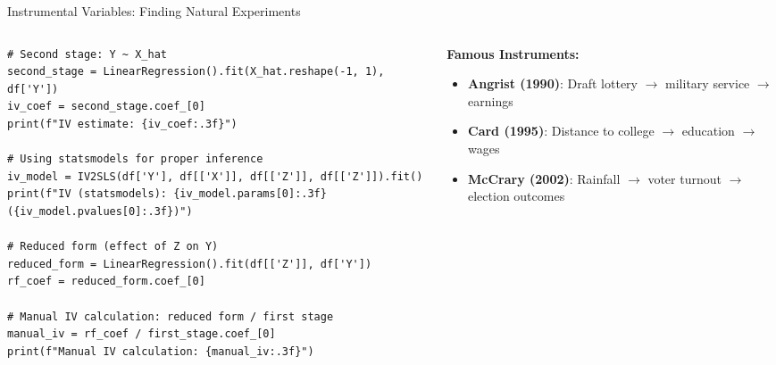 \documentclass[aspectratio=169,11pt]{beamer}
\begin{document}
\begin{frame}[fragile]{Instrumental Variables: Finding Natural Experiments}
\begin{columns}
\begin{column}{0.55\textwidth}
\begin{lstlisting}[basicstyle=\ttfamily\tiny]
# Second stage: Y ~ X_hat
second_stage = LinearRegression().fit(X_hat.reshape(-1, 1), df['Y'])
iv_coef = second_stage.coef_[0]
print(f"IV estimate: {iv_coef:.3f}")

# Using statsmodels for proper inference
iv_model = IV2SLS(df['Y'], df[['X']], df[['Z']], df[['Z']]).fit()
print(f"IV (statsmodels): {iv_model.params[0]:.3f} ({iv_model.pvalues[0]:.3f})")

# Reduced form (effect of Z on Y)
reduced_form = LinearRegression().fit(df[['Z']], df['Y'])
rf_coef = reduced_form.coef_[0]

# Manual IV calculation: reduced form / first stage
manual_iv = rf_coef / first_stage.coef_[0]
print(f"Manual IV calculation: {manual_iv:.3f}")
\end{lstlisting}
\end{column}
\begin{column}{0.45\textwidth}
\begin{figure}
\centering
{}
\end{figure}

\textbf{Famous Instruments:}
\begin{itemize}
\item \textbf{Angrist (1990)}: Draft lottery $\rightarrow$ military service $\rightarrow$ earnings
\item \textbf{Card (1995)}: Distance to college $\rightarrow$ education $\rightarrow$ wages
\item \textbf{McCrary (2002)}: Rainfall $\rightarrow$ voter turnout $\rightarrow$ election outcomes
\end{itemize}


\end{column}
\end{columns}
\end{frame}
\end{document}
